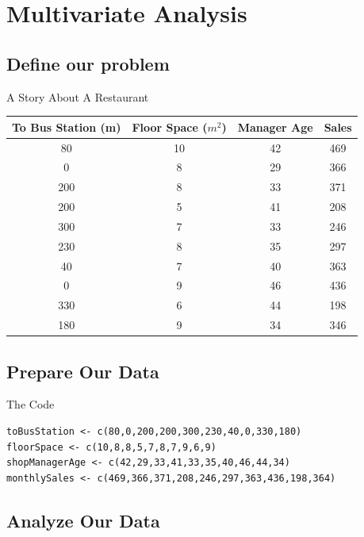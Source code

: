 \documentclass{beamer}
\begin{document}
\section{Multivariate Analysis}

\subsection{Define our problem}

\begin{frame}{A Story About A Restaurant}

\begin{tabular}{|c|c|c|c|}
\hline
To Bus Station (m) & Floor Space ($m^2$) & Manager Age & Sales  \\ \hline \hline
80 & 10 & 42 & 469 \\
0 & 8 & 29 & 366 \\
200 & 8 & 33 & 371 \\
200 & 5 & 41 & 208 \\
300 & 7 & 33 & 246 \\
230 & 8 & 35 & 297 \\
40 & 7 & 40 & 363 \\
0 & 9 & 46 & 436 \\
330 & 6 & 44 & 198 \\
180 & 9 & 34 & 346 \\
\hline
\end{tabular}

\end{frame}

\subsection{Prepare Our Data}

\begin{frame}[fragile]{The Code}

\begin{footnotesize}
\begin{verbatim}
toBusStation <- c(80,0,200,200,300,230,40,0,330,180)
floorSpace <- c(10,8,8,5,7,8,7,9,6,9)
shopManagerAge <- c(42,29,33,41,33,35,40,46,44,34)
monthlySales <- c(469,366,371,208,246,297,363,436,198,364)
\end{verbatim}
\end{footnotesize}

\end{frame}

\subsection{Analyze Our Data}
\end{document}

